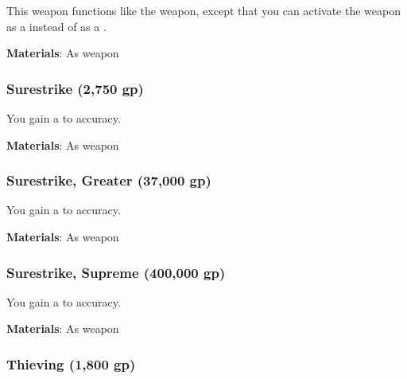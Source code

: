 This weapon functions like the  weapon, except that you can activate the weapon as a  instead of as a .



\vspace{0.25em}
\textbf{Materials}: As weapon


\lowercase{\hypertarget{item:Surestrike}{}}\label{item:Surestrike}
\hypertarget{item:Surestrike}{\subsubsection{Surestrike\hfill{} (2,750 gp)}}

You gain a   to accuracy.



\vspace{0.25em}
\textbf{Materials}: As weapon


\lowercase{\hypertarget{item:Surestrike, Greater}{}}\label{item:Surestrike, Greater}
\hypertarget{item:Surestrike, Greater}{\subsubsection{Surestrike, Greater\hfill{} (37,000 gp)}}

You gain a   to accuracy.



\vspace{0.25em}
\textbf{Materials}: As weapon


\lowercase{\hypertarget{item:Surestrike, Supreme}{}}\label{item:Surestrike, Supreme}
\hypertarget{item:Surestrike, Supreme}{\subsubsection{Surestrike, Supreme\hfill{} (400,000 gp)}}

You gain a   to accuracy.



\vspace{0.25em}
\textbf{Materials}: As weapon


\lowercase{\hypertarget{item:Thieving}{}}\label{item:Thieving}
\hypertarget{item:Thieving}{\subsubsection{Thieving\hfill{} (1,800 gp)}}

